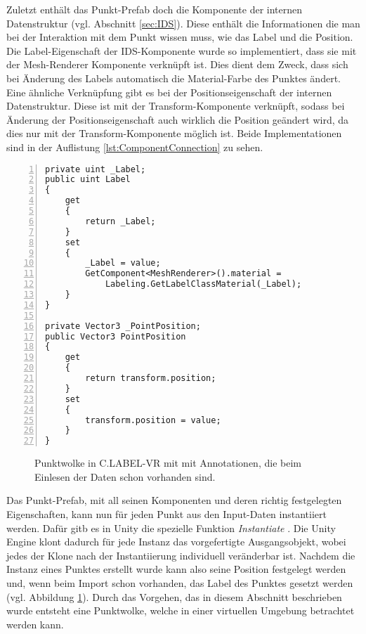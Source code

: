 Zuletzt enthält das Punkt-Prefab doch die Komponente der internen Datenstruktur (vgl. Abschnitt \ref{sec:IDS}). Diese enthält die Informationen die man bei der Interaktion mit dem Punkt wissen muss, wie das Label und die Position. Die Label-Eigenschaft der IDS-Komponente wurde so implementiert, dass sie mit der Mesh-Renderer Komponente verknüpft ist. Dies dient dem Zweck, dass sich bei Änderung des Labels automatisch die Material-Farbe des Punktes ändert. Eine ähnliche Verknüpfung gibt es bei der Positionseigenschaft der internen Datenstruktur. Diese ist mit der Transform-Komponente verknüpft, sodass bei Änderung der Positionseigenschaft auch wirklich die Position geändert wird, da dies nur mit der Transform-Komponente möglich ist. Beide Implementationen sind in der Auflistung \ref{lst:ComponentConnection} zu sehen.

\begin{lstlisting}[caption={Verknupfung von Label- und Positionseigenschaft der IDS-Komponente mit anderen Komponenten}, captionpos=t,numbers=left , label=lst:ComponentConnection]
private uint _Label;
public uint Label
{
    get
    {
        return _Label;
    }
    set
    {
        _Label = value;
        GetComponent<MeshRenderer>().material = 
        	Labeling.GetLabelClassMaterial(_Label);
    }
}

private Vector3 _PointPosition;
public Vector3 PointPosition
{
    get
    {
        return transform.position;
    }
    set
    {
        transform.position = value;
    }
}
\end{lstlisting}
\quad

\begin{figure}%
	\centering
    \caption{Punktwolke in C.LABEL-VR mit mit Annotationen, die beim Einlesen der Daten schon vorhanden sind.}
    \label{fig:PreLabelCloud}
\end{figure}

Das Punkt-Prefab, mit all seinen Komponenten und deren richtig festgelegten Eigenschaften, kann nun für jeden Punkt aus den Input-Daten instantiiert werden. Dafür gitb es in Unity die spezielle Funktion \textit{Instantiate} \cite{bib:Instantiate}. Die Unity Engine klont dadurch für jede Instanz das vorgefertigte Ausgangsobjekt, wobei jedes der Klone nach der Instantiierung individuell veränderbar ist. Nachdem die Instanz eines Punktes erstellt wurde kann also seine Position festgelegt werden und, wenn beim Import schon vorhanden, das Label des Punktes gesetzt werden (vgl. Abbildung \ref{fig:PreLabelCloud}). Durch das Vorgehen, das in diesem Abschnitt beschrieben wurde entsteht eine Punktwolke, welche in einer virtuellen Umgebung betrachtet werden kann. 

